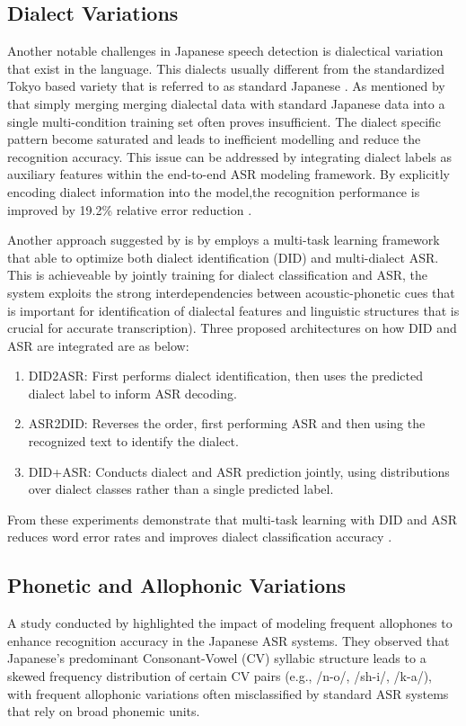 \subsection{Dialect Variations}
Another notable challenges in Japanese speech detection is dialectical variation that exist in the language. This dialects usually different from the standardized Tokyo based variety that is referred to as standard Japanese \parencite{takahashi2024comparison}. As mentioned by \textcite{Imaizumi2020Dialect-Aware} that simply merging  merging dialectal data with standard Japanese data into a single multi-condition training set often proves insufficient. The dialect specific pattern become saturated and leads to inefficient modelling  and reduce the recognition accuracy. This issue can be addressed by integrating dialect labels as auxiliary features within the end-to-end ASR modeling framework. By explicitly encoding dialect information into the model,the recognition performance is improved by 19.2\% relative error reduction \parencite{Imaizumi2020Dialect-Aware}.

Another approach suggested by \textcite{imaizumi2022} is by employs a multi-task learning framework that able to optimize both dialect identification (DID) and multi-dialect ASR. This is achieveable by jointly training for dialect classification and ASR, the system exploits the strong interdependencies between acoustic-phonetic cues that is important for identification of dialectal features and linguistic structures that is crucial for accurate transcription). Three proposed architectures on how DID and ASR are integrated are as below:

\begin{enumerate}
    \item DID2ASR: First performs dialect identification, then uses the predicted dialect label to inform ASR decoding. 
    \item ASR2DID: Reverses the order, first performing ASR and then using the recognized text to identify the dialect. 
    \item DID+ASR: Conducts dialect and ASR prediction jointly, using distributions over dialect classes rather than a single predicted label.
\end{enumerate}

 
From these experiments demonstrate that multi-task learning with DID and ASR reduces word error rates and improves dialect classification accuracy \parencite{takahashi2024comparison}. 

\subsection{Phonetic and Allophonic Variations}
A study conducted by \textcite{Nguyen2002ModelingFA} highlighted the impact of modeling frequent allophones to enhance recognition accuracy in the Japanese ASR systems. They observed that Japanese's predominant Consonant-Vowel (CV) syllabic structure leads to a skewed frequency distribution of certain CV pairs (e.g., /n-o/, /sh-i/, /k-a/), with frequent allophonic variations often misclassified by standard ASR systems that rely on broad phonemic units. 

